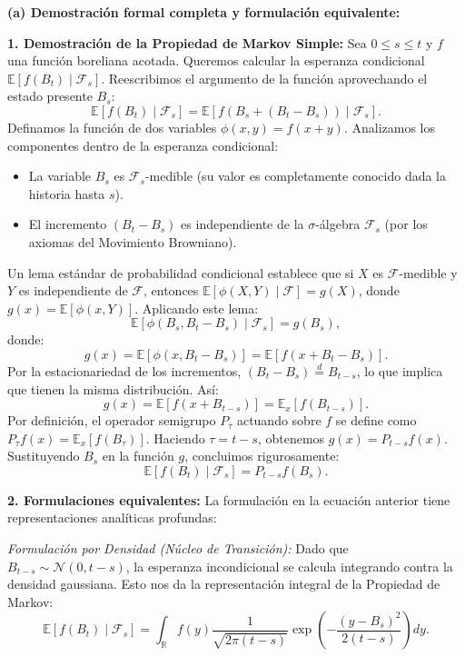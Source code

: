 \documentclass[11pt, letterpaper]{article}
\begin{document}
\begin{solucion}
    \vspace{3mm}
    \textbf{(a) Demostración formal completa y formulación equivalente:}

    \textbf{1. Demostración de la Propiedad de Markov Simple:}
    Sea $0 \le s \le t$ y $f$ una función boreliana acotada. Queremos calcular la esperanza condicional $\mathbb{E}[f(B_t) \mid \mathcal{F}_s]$.
    Reescribimos el argumento de la función aprovechando el estado presente $B_s$:
    \[ \mathbb{E}[f(B_t) \mid \mathcal{F}_s] = \mathbb{E}[f(B_s + (B_t - B_s)) \mid \mathcal{F}_s]. \]
    Definamos la función de dos variables $\phi(x, y) = f(x + y)$. 
    Analizamos los componentes dentro de la esperanza condicional:
    \begin{itemize}
        \item La variable $B_s$ es $\mathcal{F}_s$-medible (su valor es completamente conocido dada la historia hasta $s$).
        \item El incremento $(B_t - B_s)$ es independiente de la $\sigma$-álgebra $\mathcal{F}_s$ (por los axiomas del Movimiento Browniano).
    \end{itemize}
    Un lema estándar de probabilidad condicional establece que si $X$ es $\mathcal{F}$-medible y $Y$ es independiente de $\mathcal{F}$, entonces $\mathbb{E}[\phi(X, Y) \mid \mathcal{F}] = g(X)$, donde $g(x) = \mathbb{E}[\phi(x, Y)]$.
    Aplicando este lema:
    \[ \mathbb{E}[\phi(B_s, B_t - B_s) \mid \mathcal{F}_s] = g(B_s), \]
    donde:
    \[ g(x) = \mathbb{E}[\phi(x, B_t - B_s)] = \mathbb{E}[f(x + B_t - B_s)]. \]
    Por la estacionariedad de los incrementos, $(B_t - B_s) \stackrel{d}{=} B_{t-s}$, lo que implica que tienen la misma distribución. Así:
    \[ g(x) = \mathbb{E}[f(x + B_{t-s})] = \mathbb{E}_x[f(B_{t-s})]. \]
    Por definición, el operador semigrupo $P_\tau$ actuando sobre $f$ se define como $P_\tau f(x) = \mathbb{E}_x[f(B_\tau)]$. 
    Haciendo $\tau = t - s$, obtenemos $g(x) = P_{t-s}f(x)$. 
    Sustituyendo $B_s$ en la función $g$, concluimos rigurosamente:
    \[ \mathbb{E}[f(B_t) \mid \mathcal{F}_s] = P_{t-s}f(B_s). \]

    \textbf{2. Formulaciones equivalentes:}
    La formulación en la ecuación anterior tiene representaciones analíticas profundas:
    
    \textit{Formulación por Densidad (Núcleo de Transición):} 
    Dado que $B_{t-s} \sim \mathcal{N}(0, t-s)$, la esperanza incondicional se calcula integrando contra la densidad gaussiana. Esto nos da la representación integral de la Propiedad de Markov:
    \[ \mathbb{E}[f(B_t) \mid \mathcal{F}_s] = \int_{\mathbb{R}} f(y) \frac{1}{\sqrt{2\pi(t-s)}} \exp\left( -\frac{(y - B_s)^2}{2(t-s)} \right) dy. \]
    

\end{solucion}
\end{document}
